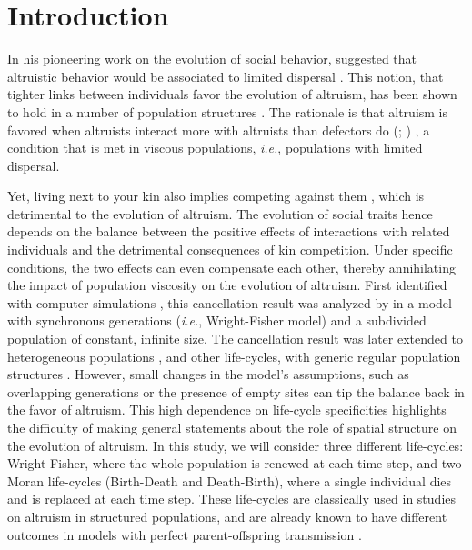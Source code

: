 \documentclass[11pt, letterpaper]{article}
\newcommand{\ie}{\textit{i.e.}}
\newcommand{\eg}{\textit{e.g.}}
\begin{document}
\section{Introduction}%
In his pioneering work on the evolution of social behavior, \citeauthor{Hamilton1964} suggested that altruistic behavior would be associated to limited dispersal \citep[p.~10]{Hamilton1964}. This notion, that tighter links between individuals favor the evolution of altruism, has been shown to hold in a number of population structures  \citep[see \eg][]{Ohtsuki2006, TaylorDayWild2007, Lehmann2007}. The rationale is that altruism is favored when altruists interact more with altruists than defectors do (\citealp[p.~141]{Hamilton1975}; \citealp{Fletcher2009})%
, a condition that is met in viscous populations, \ie, populations with limited dispersal.

Yet, living next to your kin also implies competing against them \citep{West2002}, which is detrimental to the evolution of altruism. The evolution of social traits hence depends on the balance between the positive effects of interactions with related individuals and the detrimental consequences of kin competition. Under specific conditions, the two effects can even compensate each other, thereby annihilating the impact of population viscosity on the evolution of altruism. 
First identified with computer simulations \citep{Wilson1992}, this cancellation result was analyzed by \citet{Taylor1992islandmodel} in a model with synchronous generations (\ie, Wright-Fisher model) and a subdivided population of constant, infinite size. The cancellation result was later extended to heterogeneous populations \citep[][with synchronous generations and infinite population size]{RodriguesGardner2012}, and other life-cycles, with generic regular population structures \citep[][with synchronous generations but also with continuous generations and Birth-Death updating]{Taylor2011}. However, small changes in the model's assumptions, such as overlapping generations \citep{TaylorIrwin2000} or the presence of empty sites \citep{Alizon2008} can tip the balance back in the favor of altruism. 
This high dependence on life-cycle specificities highlights the difficulty of making general statements about the role of spatial structure on the evolution of altruism. 
In this study, we will consider three different life-cycles: Wright-Fisher, where the whole population is renewed at each time step, and two Moran life-cycles (Birth-Death and Death-Birth), where a single individual dies and is replaced at each time step. These life-cycles are classically used in studies on altruism in structured populations, and are already known to have different outcomes in models with perfect parent-offspring transmission \citep[\eg,][]{Taylor1992islandmodel, Rousset2004Book,Ohtsuki2006, Lehmann2007, Taylor2010}. 
\end{document}
